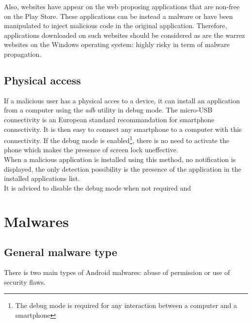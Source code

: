 Also, websites have appear on the web proposing applications that are non-free on the Play Store.
These applications can be instead a malware or have been manipulated to inject malicious code in the original application.
Therefore, applications downloaded on such websites should be considered as are the warrez websites on the Windows operating system: highly risky in term of malware propagation.

\subsection{Physical access}

If a malicious user has a physical acces to a device, it can install an application from a computer using the \emph{adb} utility in debug mode.
The micro-USB connectivity is an European standard recommandation for smartphone connectivity.
It is then easy to connect any smartphone to a computer with this connectivity.
If the debug mode is enabled\footnote{The debug mode is required for any interaction between a computer and a smartphone}, there is no need to activate the phone which makes the presence of screen lock uneffective.\\

When a malicious application is installed using this method, no notification is displayed, the only detection possibility is the presence of the application in the installed applications list.\\

It is adviced to disable the debug mode when not required and 

\section{Malwares}

\subsection{General malware type}
\label{sec:malware-type}


There is two main types of Android malwares: abuse of permission or use of security flaws.\\

